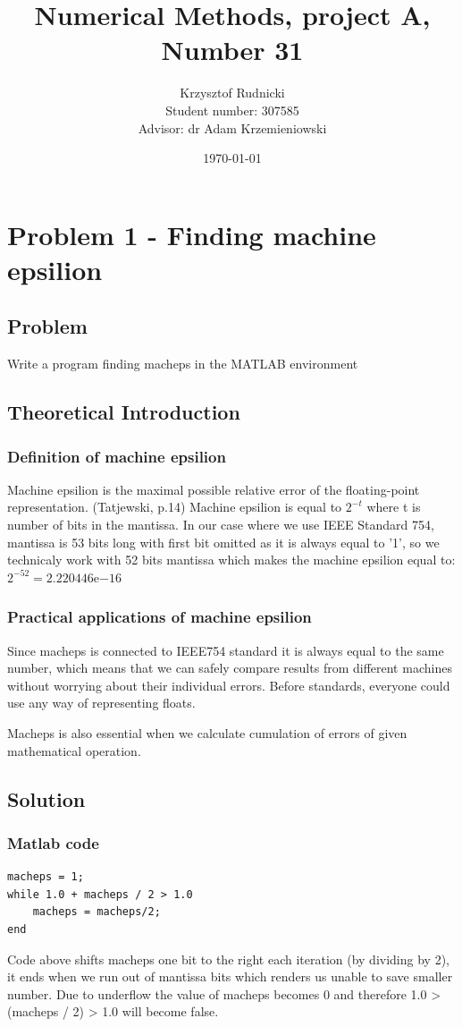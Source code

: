 \documentclass[12pt]{report}
\title{Numerical Methods, project A, Number 31}
\author{Krzysztof Rudnicki\\ Student number: 307585 \\ Advisor: dr Adam Krzemieniowski}
\date{\today}
\begin{document}
\maketitle
\tableofcontents

\chapter{Problem 1 - Finding machine epsilion}

\section{Problem}
Write a program finding macheps in the MATLAB environment
\section{Theoretical Introduction}
\subsection{Definition of machine epsilion}
Machine epsilion is the maximal possible relative error of the floating-point representation. (Tatjewski, p.14)
Machine epsilion is equal to $2^{-t}$ where t is number of bits in the mantissa.
In our case where we use IEEE Standard 754, mantissa is 53 bits long with first bit omitted as it is always equal to '1', so we technicaly work with 52 bits mantissa which makes the machine epsilion equal to: $2^{-52} = 2.220446\mathrm{e}{-16}$

\newpage
\subsection{Practical applications of machine epsilion}
Since macheps is connected to IEEE754 standard it is always equal to the same number, which means that we can safely compare results from different machines without worrying about their individual errors. Before standards, everyone could use any way of representing floats.

Macheps is also essential when we calculate cumulation of errors of given mathematical operation.

\newpage
\section{Solution}

\subsection{Matlab code}
\begin{lstlisting}
macheps = 1;
while 1.0 + macheps / 2 > 1.0
    macheps = macheps/2;
end
\end{lstlisting}
Code above shifts macheps one bit to the right each iteration (by dividing by 2), it ends when we run out of mantissa bits which renders us unable to save smaller number. Due to underflow the value of macheps becomes 0 and therefore 1.0 > (macheps / 2) > 1.0 will become false.
\newpage
\end{document}
